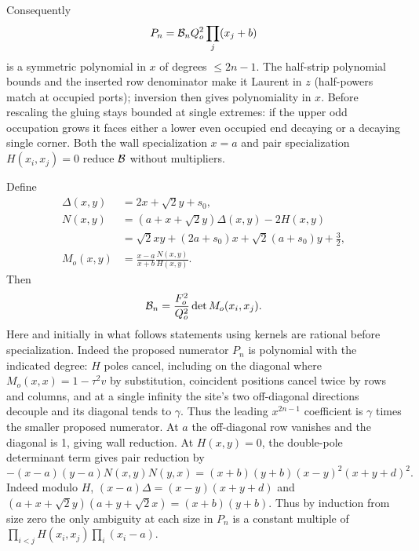 \documentclass[11pt]{article}
\numberwithin{equation}{section}
\theoremstyle{definition}\newtheorem{definition}[theorem]{Definition}
\theoremstyle{remark}\newtheorem{remark}[theorem]{Remark}
\begin{document}
Consequently
\[
 P_n={\cal B}_n Q_o^2\prod_j(x_j+b)
\]
is a symmetric polynomial in \(x\) of degrees \(\le2n-1\). The half-strip polynomial bounds and the inserted row denominator make it Laurent in \(z\) (half-powers match at occupied ports); inversion then gives polynomiality in \(x\). Before rescaling the gluing stays bounded at single extremes: if the upper odd occupation grows it faces either a lower even occupied end decaying or a decaying single corner. Both the wall specialization \(x=a\) and pair specialization \(H(x_i,x_j)=0\) reduce \({\cal B}\) without multipliers.

Define
\[
\begin{aligned}
 \Delta(x,y)&=2x+\sqrt2 y+s_0,\\
 N(x,y)&=(a+x+\sqrt2 y)\Delta(x,y)-2H(x,y)\\
       &=\sqrt2 xy+(2a+s_0)x+\sqrt2(a+s_0)y+\tfrac32 ,\\
 M_o(x,y)&=\frac{x-a}{x+b}\frac{N(x,y)}{H(x,y)}.
\end{aligned}
\]
Then
\[
 {\cal B}_n=\frac{F_o^2}{Q_o^2}\det M_o(x_i,x_j).
\]
Here and initially in what follows statements using kernels are rational before specialization. Indeed the proposed numerator \(P_n\) is polynomial with the indicated degree: \(H\) poles cancel, including on the diagonal where \(M_o(x,x)=1-\tau^2 v\) by substitution, coincident positions cancel twice by rows and columns, and at a single infinity the site's two off-diagonal directions decouple and its diagonal tends to \(\gamma\). Thus the leading \(x^{2n-1}\) coefficient is \(\gamma\) times the smaller proposed numerator. At \(a\) the off-diagonal row vanishes and the diagonal is 1, giving wall reduction. At \(H(x,y)=0\), the double-pole determinant term gives pair reduction by
\[
 -(x-a)(y-a) N(x,y)N(y,x)=(x+b)(y+b)(x-y)^2(x+y+d)^2 .
\]
Indeed modulo \(H\), \((x-a)\Delta=(x-y)(x+y+d)\) and \((a+x+\sqrt2 y)(a+y+\sqrt2 x)=(x+b)(y+b)\). Thus by induction from size zero the only ambiguity at each size in \(P_n\) is a constant multiple of \(\prod_{i<j}H(x_i,x_j)\prod_i(x_i-a)\).
\end{document}
